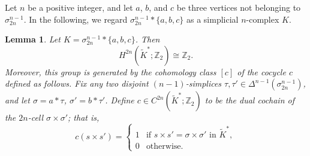 \documentclass[10pt,a4paper]{amsart}
\newtheorem{Lemma}[Theorem]{Lemma}
\numberwithin{equation}{section}
\begin{document}
Let $n$ be a positive integer, and let $a$, $b$, and $c$ be three vertices not belonging to $\sigma_{2n}^{n-1}$. In the following, we regard $\sigma_{2n}^{n-1} * \{a,b,c\}$ as a simplicial $n$-complex $K$.

\begin{Lemma}\label{cohomo}
Let $K = \sigma_{2n}^{n-1} * \{a,b,c\}$. Then 
\[
H^{2n}(\widetilde{K}^*;\mathbb{Z}_2) \cong \mathbb{Z}_2.
\]
Moreover, this group is generated by the cohomology class $[c]$ of the cocycle $c$ defined as follows. Fix any two disjoint $(n-1)$-simplices $\tau, \tau' \in \varDelta^{n-1}(\sigma_{2n}^{n-1})$, and let $\sigma = a*\tau$, $\sigma' = b*\tau'$. Define $c \in C^{2n}(\widetilde{K}^*;\mathbb{Z}_2)$ to be the dual cochain of the $2n$-cell $\sigma \times \sigma'$; that is,
\[
c(s \times s') = 
\begin{cases}
1 & \text{if } s \times s' = \sigma \times \sigma' \text{ in } \widetilde{K}^*, \\
0 & \text{otherwise}.
\end{cases}
\]
\end{Lemma}
\end{document}
